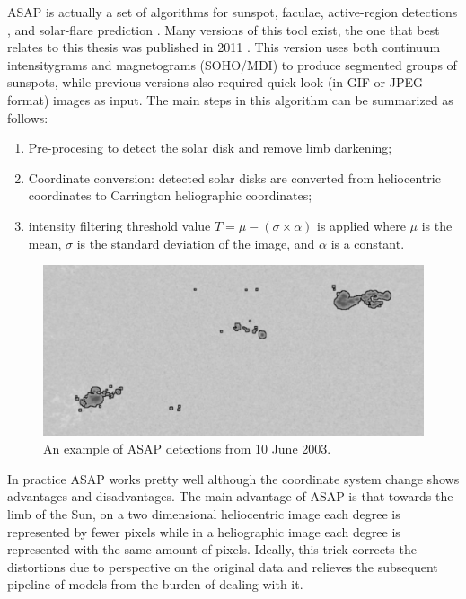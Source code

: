 \bigbreak
\noindent ASAP is actually a set of algorithms for sunspot, faculae, active-region detections \cite{colak2008automated}, and solar-flare prediction \cite{colak2009automated}. Many versions of this tool exist, the one that best relates to this thesis  was published in 2011 \cite{colak2011representation}. This version uses both continuum intensitygrams and magnetograms (SOHO/MDI) to produce segmented groups of sunspots, while previous versions also required quick look (in GIF or JPEG format) images as input. The main steps in this algorithm can be summarized as follows:
\begin{enumerate}
  \item Pre-procesing to detect the solar disk and remove limb darkening;
  \item Coordinate conversion: detected solar disks are converted from heliocentric coordinates to Carrington heliographic coordinates;
  \item intensity filtering threshold value $T = \mu - (\sigma \times \alpha)$ is applied where $\mu$ is the mean, $\sigma$ is the standard deviation of the image, and $\alpha$ is a constant.
\end{enumerate}
\begin{figure}[t]
    \centering
    \captionsetup{justification=centering}
    \includegraphics[width=\textwidth]{./pictures/asap-example-detection}
    \caption{An example of ASAP detections from 10 June 2003.}
    \label{fig:asap-example}
\end{figure}
\bigbreak
\noindent In practice ASAP works pretty well \cite{verbeeck2013multi} although the coordinate system change shows advantages and disadvantages. The main advantage of ASAP is that towards the limb of the Sun, on a two dimensional heliocentric image each degree is represented by fewer pixels while in a heliographic image each degree is represented with the same amount of pixels. Ideally, this trick corrects the distortions due to perspective on the original data and relieves the subsequent pipeline of models from the burden of dealing with it.
